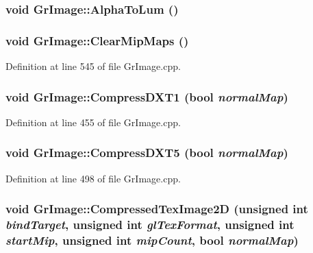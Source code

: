\begin{CompactItemize}
{\subsubsection[{AlphaToLum}]{\setlength{\rightskip}{0pt plus 5cm}void GrImage::AlphaToLum ()}}
\label{class_gr_image_0a187b271d32fc3aa75a147b6e9e691b}


\hypertarget{class_gr_image_af7a1554288af6dc8a5ef14aed1c6162}{
\subsubsection[{ClearMipMaps}]{\setlength{\rightskip}{0pt plus 5cm}void GrImage::ClearMipMaps ()}}
\label{class_gr_image_af7a1554288af6dc8a5ef14aed1c6162}




Definition at line 545 of file GrImage.cpp.\hypertarget{class_gr_image_de98dd0d8da1c4ff3a4cd3d2b248ce68}{
\subsubsection[{CompressDXT1}]{\setlength{\rightskip}{0pt plus 5cm}void GrImage::CompressDXT1 (bool {\em normalMap})}}
\label{class_gr_image_de98dd0d8da1c4ff3a4cd3d2b248ce68}




Definition at line 455 of file GrImage.cpp.\hypertarget{class_gr_image_688d884b98edfbeb204fa3231c71c357}{
\subsubsection[{CompressDXT5}]{\setlength{\rightskip}{0pt plus 5cm}void GrImage::CompressDXT5 (bool {\em normalMap})}}
\label{class_gr_image_688d884b98edfbeb204fa3231c71c357}




Definition at line 498 of file GrImage.cpp.\hypertarget{class_gr_image_0b346c74770977c9ec085152dcf4153e}{
\subsubsection[{CompressedTexImage2D}]{\setlength{\rightskip}{0pt plus 5cm}void GrImage::CompressedTexImage2D (unsigned int {\em bindTarget}, \/  unsigned int {\em glTexFormat}, \/  unsigned int {\em startMip}, \/  unsigned int {\em mipCount}, \/  bool {\em normalMap})}}
\label{class_gr_image_0b346c74770977c9ec085152dcf4153e}





\end{CompactItemize}

